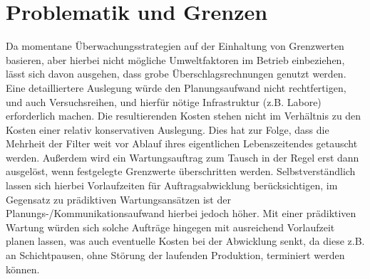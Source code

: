     \section{Problematik und Grenzen}
    Da momentane Überwachungsstrategien auf der Einhaltung von Grenzwerten basieren, aber hierbei nicht mögliche Umweltfaktoren im Betrieb einbeziehen, lässt sich davon ausgehen, dass grobe Überschlagsrechnungen genutzt werden. Eine detailliertere Auslegung würde den Planungsaufwand nicht rechtfertigen, und auch Versuchsreihen, und hierfür nötige Infrastruktur (z.B. Labore) erforderlich machen. Die resultierenden Kosten stehen nicht im Verhältnis zu den Kosten einer relativ konservativen Auslegung. Dies hat zur Folge, dass die Mehrheit der Filter weit vor Ablauf ihres eigentlichen Lebenszeitendes getauscht werden. Außerdem wird ein Wartungsauftrag zum Tausch in der Regel erst dann ausgelöst, wenn festgelegte Grenzwerte überschritten werden. Selbstverständlich lassen sich hierbei Vorlaufzeiten für Auftragsabwicklung berücksichtigen, im Gegensatz zu prädiktiven Wartungsansätzen ist der Planungs-/Kommunikationsaufwand hierbei jedoch höher. Mit einer prädiktiven Wartung würden sich solche Aufträge hingegen mit ausreichend Vorlaufzeit planen lassen, was auch eventuelle Kosten bei der Abwicklung senkt, da diese z.B. an Schichtpausen, ohne Störung der laufenden Produktion, terminiert werden können.
